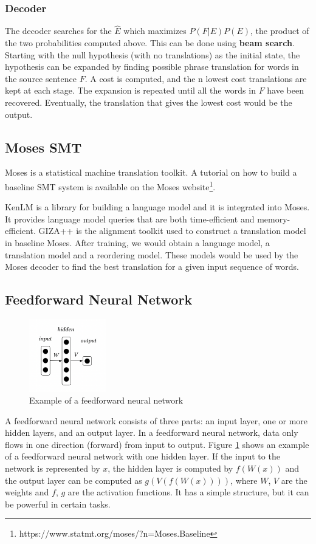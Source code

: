 \documentclass[12pt,a4paper,twoside,openright]{report}
\begin{document}
\subsubsection{Decoder}
The decoder searches for the $\hat{E}$ which maximizes $P(F|E)P(E)$, the product of the two probabilities computed above. This can be done using \textbf{beam search}. Starting with the null hypothesis (with no translations) as the initial state, the hypothesis can be expanded by finding possible phrase translation for words in the source sentence $F$. A cost is computed, and the n lowest cost translations are kept at each stage. The expansion is repeated until all the words in $F$ have been recovered. Eventually, the translation that gives the lowest cost would be the output.

\subsection{Moses SMT}
Moses\cite{moses} is a statistical machine translation toolkit. A tutorial on how to build a baseline SMT system is available on the Moses website\footnote{https://www.statmt.org/moses/?n=Moses.Baseline}. 

KenLM\cite{heafield-2011-kenlm} is a library for building a language model and it is integrated into Moses. It provides language model queries that are both time-efficient and memory-efficient. GIZA++\cite{giza_pp} is the alignment toolkit used to construct a translation model in baseline Moses. After training, we would obtain a language model, a translation model and a reordering model. These models would be used by the Moses decoder to find the best translation for a given input sequence of words.

\subsection{Feedforward Neural Network}
\begin{figure}[ht]
\centering
\includegraphics[width=0.3\textwidth]{images/fnn.png}
\caption{Example of a feedforward neural network}
\label{fig:fnn}
\end{figure}
A feedforward neural network consists of three parts: an input layer, one or more hidden layers, and an output layer. In a feedforward neural network, data only flows in one direction (forward) from input to output. Figure \ref{fig:fnn} shows an example of a feedforward neural network with one hidden layer. If the input to the network is represented by $x$, the hidden layer is computed by $f(W(x))$ and the output layer can be computed as $g(V(f(W(x))))$, where $W$, $V$ are the weights and $f$, $g$ are the activation functions. It has a simple structure, but it can be powerful in certain tasks.
\end{document}
